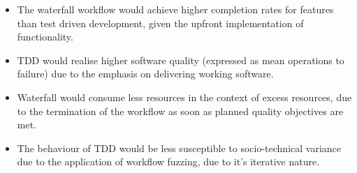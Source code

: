 \documentclass{sig-alternate}
\begin{document}
\begin{itemize}

\item The waterfall workflow would achieve higher completion rates for features
  than test driven development, given the upfront implementation of
  functionality.

\item TDD would realise higher software quality (expressed as mean operations to
  failure) due to the emphasis on delivering working software.

\item Waterfall would consume less resources in the context of excess resources,
  due to the termination of the workflow as soon as planned quality objectives
  are met.

\item The behaviour of TDD would be less susceptible to socio-technical variance
  due to the application of workflow fuzzing, due to it's iterative nature.

\end{itemize}
\end{document}
